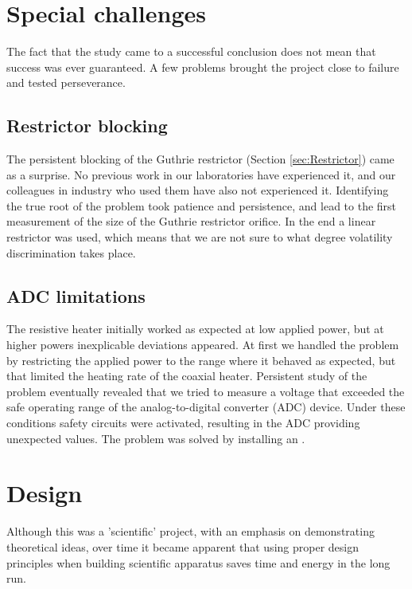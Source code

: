 \section{Special challenges}

The fact that the study came to a successful conclusion does not mean that
success was ever guaranteed. A few problems brought the project close to
failure and tested perseverance.

\subsection{Restrictor blocking}

The persistent blocking of the Guthrie restrictor (Section \ref{sec:Restrictor})
came as a surprise. No previous work in our laboratories have experienced it,
and our colleagues in industry who used them have also not experienced it.
Identifying the true root of the problem took patience and persistence, and lead
to the first measurement of the size of the Guthrie restrictor orifice. In the
end a linear restrictor was used, which means that we are not sure to what
degree volatility discrimination takes place.

\subsection{ADC limitations}

The resistive heater initially worked as expected at low applied power, but at
higher powers inexplicable deviations appeared. At first we handled the problem
by restricting the applied power to the range where it behaved as expected, but
that limited the heating rate of the coaxial heater. Persistent study of the
problem eventually revealed that we tried to measure a voltage that exceeded the
safe operating range of the analog-to-digital converter (ADC) device. Under
these conditions safety circuits were activated, resulting in the ADC providing
unexpected values. The problem was solved by installing an .


\section{Design}

Although this was a 'scientific' project, with an emphasis on demonstrating
theoretical ideas, over time it became apparent that using proper design
principles when building scientific apparatus saves time and energy in the long
run.


